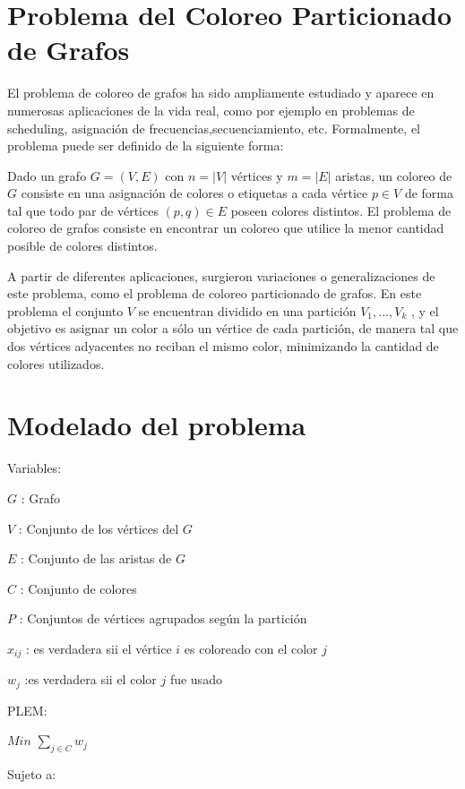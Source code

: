 \documentclass[a4paper]{article}
\begin{document}
\newpage

\section{Problema del Coloreo Particionado de Grafos}

El problema de coloreo de grafos ha sido ampliamente estudiado y aparece en numerosas aplicaciones de la vida real, como por ejemplo en problemas de scheduling, asignación de frecuencias,secuenciamiento, etc. Formalmente, el problema puede ser definido de la siguiente forma: 

Dado un grafo $G = (V,E)$ con $n = |V|$ vértices y $m = |E|$ aristas, un coloreo de $G$ consiste en una asignación de colores o etiquetas a cada vértice $p\in V$ de forma tal que todo par de vértices $(p, q) \in E$ poseen colores distintos. El problema de coloreo de grafos consiste en encontrar un coloreo que utilice la menor cantidad posible de colores distintos.

A partir de diferentes aplicaciones, surgieron variaciones o generalizaciones de este problema, como el problema de coloreo particionado de grafos. En este problema el conjunto $V$ se encuentran dividido en una partición $V_1 , . . . , V_k$ , y el objetivo es asignar un color a sólo un vértice de cada partición, de manera tal que dos vértices adyacentes no reciban el mismo color, minimizando la cantidad de colores utilizados.

\newpage

\section{Modelado del problema}

Variables:

$G$ : Grafo

$V$ : Conjunto de los vértices del $G$

$E$ : Conjunto de las aristas de $G$

$C$ : Conjunto de colores

$P$ : Conjuntos de vértices agrupados según la partición

$x_{ij}$ : es verdadera sii el vértice $i$ es coloreado con el color $j$

$w_j$ :es verdadera sii el color $j$ fue usado



PLEM:

$Min$ $ \sum_{j\in C} w_j$

Sujeto a:
\end{document}
